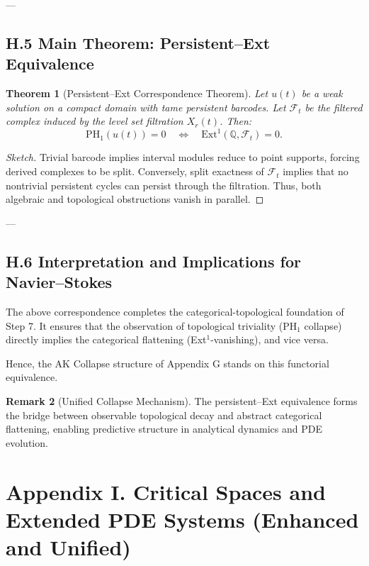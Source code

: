 \documentclass[11pt]{article}
\newtheorem{theorem}{Theorem}[section]
\theoremstyle{definition}
\newtheorem{remark}[theorem]{Remark}
\begin{document}
---

\subsection*{H.5 Main Theorem: Persistent–Ext Equivalence}

\begin{theorem}[Persistent–Ext Correspondence Theorem]
Let $u(t)$ be a weak solution on a compact domain with tame persistent barcodes.  
Let $\mathcal{F}_t$ be the filtered complex induced by the level set filtration $X_r(t)$.  
Then:
\[
\mathrm{PH}_1(u(t)) = 0 \quad \Longleftrightarrow \quad \mathrm{Ext}^1(\mathbb{Q}, \mathcal{F}_t) = 0.
\]
\end{theorem}

\begin{proof}[Sketch]
Trivial barcode implies interval modules reduce to point supports, forcing derived complexes to be split.  
Conversely, split exactness of $\mathcal{F}_t$ implies that no nontrivial persistent cycles can persist through the filtration.  
Thus, both algebraic and topological obstructions vanish in parallel.
\end{proof}

---

\subsection*{H.6 Interpretation and Implications for Navier–Stokes}

The above correspondence completes the categorical-topological foundation of Step 7.  
It ensures that the observation of topological triviality (PH$_1$ collapse) directly implies the categorical flattening (Ext$^1$-vanishing), and vice versa.

Hence, the AK Collapse structure of Appendix G stands on this functorial equivalence.

\begin{remark}[Unified Collapse Mechanism]
The persistent–Ext equivalence forms the bridge between observable topological decay and abstract categorical flattening,  
enabling predictive structure in analytical dynamics and PDE evolution.
\end{remark}


\section*{Appendix I. Critical Spaces and Extended PDE Systems (Enhanced and Unified)}
\end{document}
